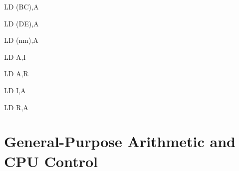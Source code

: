 \documentclass[12pt,twoside,openright,a4paper]{book}
\begin{document}
\begin{instrtable}

	\begin{instruction}{LD (BC),A} 
			\FlagsLDr
	\end{instruction}

	\begin{instruction}{LD (DE),A} 
			\FlagsLDr
	\end{instruction}

	\begin{instruction}{LD (nm),A} 
			\FlagsLDr
		\SkipToOpCode
		\SkipToOpCode
	\end{instruction}

	\begin{instruction}{LD A,I} 
			\FlagsLDair
		\SkipToOpCode
	\end{instruction}

	\begin{instruction}{LD A,R} 
			\FlagsLDair
		\SkipToOpCode
	\end{instruction}

	\begin{instruction}{LD I,A} 
			\FlagsLDr
		\SkipToOpCode
	\end{instruction}

	\begin{lastinstruction}{LD R,A} 
			\FlagsLDr
		\SkipToOpCode
	\end{lastinstruction}

\end{instrtable}



\section{General-Purpose Arithmetic and CPU Control}
\end{document}
